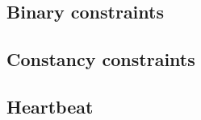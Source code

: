\subsection{Binary constraints}    \label{mxp: constraints: binary}         
\subsection{Constancy constraints} \label{mxp: constraints: constancies}    
\subsection{Heartbeat}             \label{mxp: constraints: heartbeat}      
